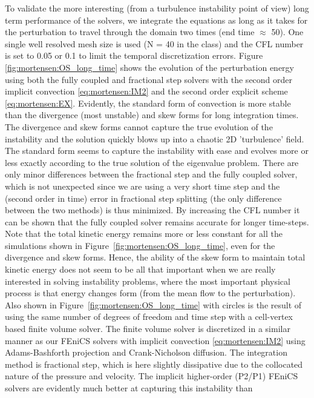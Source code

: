 To validate the more interesting (from a turbulence instability point
of view) long term performance of the solvers, we integrate the
equations as long as it takes for the perturbation to travel through
the domain two times (end time $\approx$ 50). One single well resolved
mesh size is used (N = 40 in the  class) and the CFL
number is set to 0.05 or 0.1 to limit the temporal discretization
errors. Figure \ref{fig:mortensen:OS_long_time} shows the evolution of
the perturbation energy using both the fully coupled and fractional
step solvers with the second order implicit convection
\eqref{eq:mortensen:IM2} and the second order explicit scheme
\eqref{eq:mortensen:EX}. Evidently, the standard form of convection is
more stable than the divergence (most unstable) and skew forms for
long integration times. The divergence and skew forms cannot capture
the true evolution of the instability and the solution quickly blows
up into a chaotic 2D 'turbulence' field. The standard form seems to
capture the instability with ease and evolves more or less exactly
according to the true solution of the eigenvalue problem. There are
only minor differences between the fractional step and the fully
coupled solver, which is not unexpected since we are using a very
short time step and the (second order in time) error in fractional
step splitting (the only difference between the two methods) is thus
minimized. By increasing the CFL number it can be shown that the fully
coupled solver remains accurate for longer time-steps. Note that the
total kinetic energy remains more or less constant for all the
simulations shown in Figure~\ref{fig:mortensen:OS_long_time}, even for
the divergence and skew forms. Hence, the ability of the skew form to
maintain total kinetic energy does not seem to be all that important
when we are really interested in solving instability problems, where
the most important physical process is that energy changes form (from
the mean flow to the perturbation). Also shown in
Figure~\ref{fig:mortensen:OS_long_time} with circles is the result of
using the same number of degrees of freedom and time step with a
cell-vertex based finite volume solver. The finite volume solver is
discretized in a similar manner as our FEniCS solvers with implicit
convection \eqref{eq:mortensen:IM2} using Adams-Bashforth projection
and Crank-Nicholson diffusion. The integration method is fractional
step, which is here slightly dissipative due to the collocated nature
of the pressure and velocity. The implicit higher-order (P2/P1) FEniCS
solvers are evidently much better at capturing this instability than
